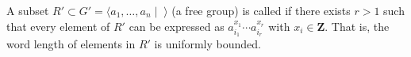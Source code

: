 A subset $R' \subset G' = \langle a_1, \ldots, a_n \mid \;\rangle$ (a free group) is called  if there exists $r > 1$ such that every element of $R'$ can be expressed as $a_{i_1}^{x_1} \cdots a_{i_r}^{x_r}$ with $x_i \in \mathbf{Z}$. That is, the word length of elements in $R'$ is uniformly bounded.
